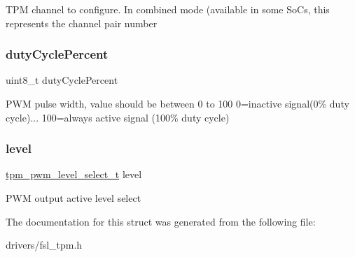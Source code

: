 T\+PM channel to configure. In combined mode (available in some SoC\textquotesingle{}s, this represents the channel pair number \mbox{\label{struct__tpm__chnl__pwm__signal__param_ab45db07ca1a7d947eb8ddd735fc28efb}} 
\subsubsection{\texorpdfstring{dutyCyclePercent}{dutyCyclePercent}}
{\footnotesize\ttfamily uint8\+\_\+t duty\+Cycle\+Percent}

P\+WM pulse width, value should be between 0 to 100 0=inactive signal(0\% duty cycle)... 100=always active signal (100\% duty cycle) \mbox{\label{struct__tpm__chnl__pwm__signal__param_a6dc96c2d40aecc0f3b18fcca3bc68cb6}} 
\subsubsection{\texorpdfstring{level}{level}}
{\footnotesize\ttfamily \mbox{\hyperlink{group__tpm_gaa50bc4e977e2e6e8abcbfc39d79f0674}{tpm\+\_\+pwm\+\_\+level\+\_\+select\+\_\+t}} level}

P\+WM output active level select 

The documentation for this struct was generated from the following file\+:\begin{DoxyCompactItemize}
\item 
drivers/fsl\+\_\+tpm.\+h\end{DoxyCompactItemize}
